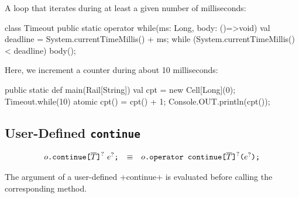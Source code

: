 \begin{ex}
  A loop that iterates during at least a given number of milliseconds:
\begin{xten}
class Timeout {
  public static operator while(ms: Long, body: ()=>void) {
    val deadline = System.currentTimeMillis() + ms;
    while (System.currentTimeMillis() < deadline) {
      body();
    }
  }
}
\end{xten}
%
Here, we increment a counter during about 10 milliseconds:
\begin{xten}
public static def main(Rail[String]) {
  val cpt = new Cell[Long](0);
  Timeout.while(10) {
    atomic { cpt() = cpt() + 1; }
  }
  Console.OUT.println(cpt());
}
\end{xten}

\end{ex}

\subsection{User-Defined  \texttt{continue}}

$$
\begin{array}{rcl}
  {o}\texttt{.continue}\texttt{[}{\overline{T}}\texttt{]}^?~{e}^?\texttt{;}
  & \equiv &
  {o}\texttt{.operator continue}\texttt{[}{\overline{T}}\texttt{]}^?\texttt{(}{e}^?\texttt{);}
\end{array}
$$

The argument of a user-defined \xcd+continue+ is evaluated before
calling the corresponding method.

